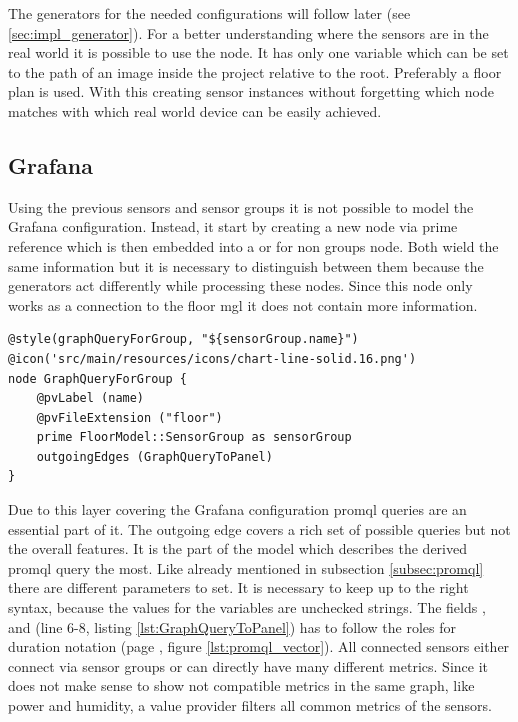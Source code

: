 The generators for the needed configurations will follow later (see \cref{sec:impl_generator}). For a better understanding where the sensors are in the real world it is possible to use the  node. It has only one variable which can be set to the path of an image inside the project relative to the root. Preferably a floor plan is used. With this creating sensor instances without forgetting which node matches with which real world device can be easily achieved.

\subsection{Grafana}

Using the previous sensors and sensor groups it is not possible to model the Grafana configuration. Instead, it start by creating a new node via prime reference which is then embedded into a  or for non groups  node. Both wield the same information but it is necessary to distinguish between them because the generators act differently while processing these nodes. Since this node only works as a connection to the floor \gls{mgl} it does not contain more information. 

\begin{listing}[H]
	\begin{verbatim}
@style(graphQueryForGroup, "${sensorGroup.name}")
@icon('src/main/resources/icons/chart-line-solid.16.png')
node GraphQueryForGroup {
	@pvLabel (name)
	@pvFileExtension ("floor")
	prime FloorModel::SensorGroup as sensorGroup
	outgoingEdges (GraphQueryToPanel)
}
	\end{verbatim}
\end{listing}

Due to this layer covering the Grafana configuration \gls{promql} queries are an essential part of it. The outgoing edge  covers a rich set of possible queries but not the overall features. It is the part of the model which describes the derived \gls{promql} query the most. Like already mentioned in subsection \ref{subsec:promql} there are different parameters to set. It is necessary to keep up to the right syntax, because the values for the variables are unchecked strings. The fields ,  and  (line 6-8, listing \ref{lst:GraphQueryToPanel}) has to follow the roles for duration notation (page \pageref{lst:promql_vector}, figure \ref{lst:promql_vector}). All connected sensors either connect via sensor groups or can directly have many different metrics. Since it does not make sense to show not compatible metrics in the same graph, like power and humidity, a value provider filters all common metrics of the sensors. 

